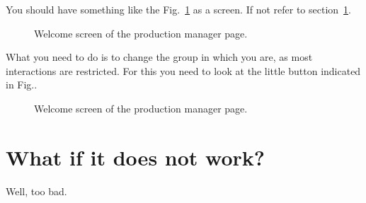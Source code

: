 \documentclass[a4paper,12pt]{article}
\begin{document}
You should have something like the Fig.~\ref{fig:welcome} as a screen. If not refer to
section~\ref{sec:problem}.
\begin{figure}[h]
\begin{center}
\end{center}
\caption{Welcome screen of the production manager page.}\label{fig:welcome}
\end{figure}

What you need to do is to change the group in which you are, as most
interactions are restricted. For this you need to look at the little button
indicated in Fig.. 
\begin{figure}[h]
\begin{center}
\end{center}
\caption{Welcome screen of the production manager page.}\label{fig:welcome2}
\end{figure}


\section{What if it does not work?}\label{sec:problem}
Well, too bad.
\end{document}
